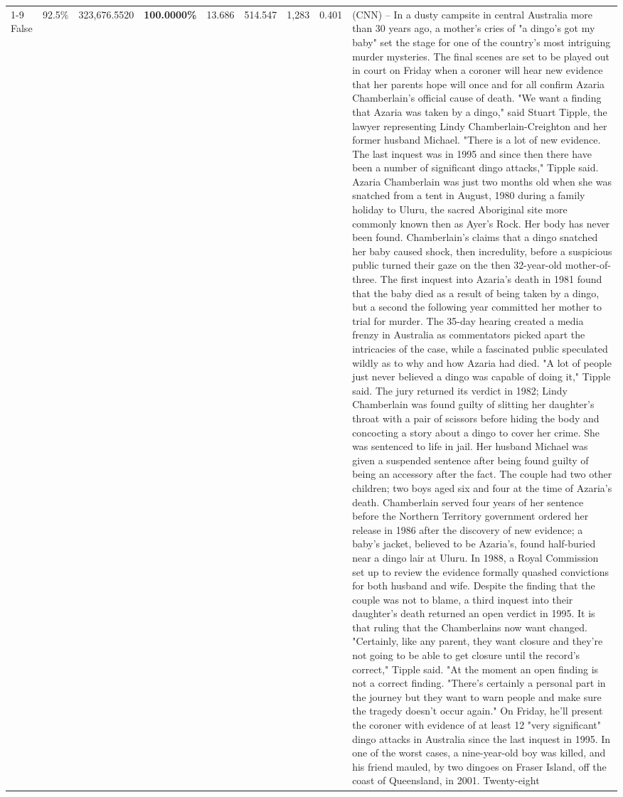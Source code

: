 \begin{table}[H]
\begin{tabular}{lllrlllll}
\cline{1-9}
False & 92.5\% & 323,676.5520 & \bfseries \color{red} 100.0000\% & 13.686 & 514.547 & 1,283 & 0.401 & (CNN) -- In a dusty campsite in central Australia more than 30 years ago, a mother's cries of "a dingo's got my baby" set the stage for one of the country's most intriguing murder mysteries. The final scenes are set to be played out in court on Friday when a coroner will hear new evidence that her parents hope will once and for all confirm Azaria Chamberlain's official cause of death. "We want a finding that Azaria was taken by a dingo," said Stuart Tipple, the lawyer representing Lindy Chamberlain-Creighton and her former husband Michael. "There is a lot of new evidence. The last inquest was in 1995 and since then there have been a number of significant dingo attacks," Tipple said. Azaria Chamberlain was just two months old when she was snatched from a tent in August, 1980 during a family holiday to Uluru, the sacred Aboriginal site more commonly known then as Ayer's Rock. Her body has never been found. Chamberlain's claims that a dingo snatched her baby caused shock, then incredulity, before a suspicious public turned their gaze on the then 32-year-old mother-of-three. The first inquest into Azaria's death in 1981 found that the baby died as a result of being taken by a dingo, but a second the following year committed her mother to trial for murder. The 35-day hearing created a media frenzy in Australia as commentators picked apart the intricacies of the case, while a fascinated public speculated wildly as to why and how Azaria had died. "A lot of people just never believed a dingo was capable of doing it," Tipple said. The jury returned its verdict in 1982; Lindy Chamberlain was found guilty of slitting her daughter's throat with a pair of scissors before hiding the body and concocting a story about a dingo to cover her crime. She was sentenced to life in jail. Her husband Michael was given a suspended sentence after being found guilty of being an accessory after the fact. The couple had two other children; two boys aged six and four at the time of Azaria's death. Chamberlain served four years of her sentence before the Northern Territory government ordered her release in 1986 after the discovery of new evidence; a baby's jacket, believed to be Azaria's, found half-buried near a dingo lair at Uluru. In 1988, a Royal Commission set up to review the evidence formally quashed convictions for both husband and wife. Despite the finding that the couple was not to blame, a third inquest into their daughter's death returned an open verdict in 1995. It is that ruling that the Chamberlains now want changed. "Certainly, like any parent, they want closure and they're not going to be able to get closure until the record's correct," Tipple said. "At the moment an open finding is not a correct finding. "There's certainly a personal part in the journey but they want to warn people and make sure the tragedy doesn't occur again." On Friday, he'll present the coroner with evidence of at least 12 "very significant" dingo attacks in Australia since the last inquest in 1995. In one of the worst cases, a nine-year-old boy was killed, and his friend mauled, by two dingoes on Fraser Island, off the coast of Queensland, in 2001. Twenty-eight 
\end{tabular}
\end{table}
